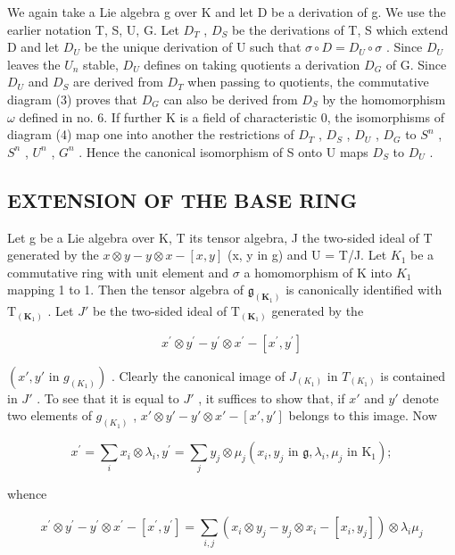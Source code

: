 We again take a Lie algebra g over K and let D be a derivation of g. We use the earlier notation T, S, U, G. Let \(D_{T}\) , \(D_{S}\) be the derivations of T, S which extend D and let \(D_{U}\) be the unique derivation of U such that \(\sigma \circ D = D_{U} \circ \sigma\) . Since \(D_{U}\) leaves the \(U_{n}\) stable, \(D_{U}\) defines on taking quotients a derivation \(D_{G}\) of G. Since \(D_{U}\) and \(D_{S}\) are derived from \(D_{T}\) when passing to quotients, the commutative diagram (3) proves that \(D_{G}\) can also be derived from \(D_{S}\) by the homomorphism \(\omega\) defined in no. 6. If further K is a field of characteristic 0, the isomorphisms of diagram (4) map one into another the restrictions of \(D_{T}\) , \(D_{S}\) , \(D_{U}\) , \(D_{G}\) to \(S^{n}\) , \(S^{n}\) , \(U^{n}\) , \(G^{n}\) . Hence the canonical isomorphism of S onto U maps \(D_{S}\) to \(D_{U}\) .

\subsection{EXTENSION OF THE BASE RING}

Let g be a Lie algebra over K, T its tensor algebra, J the two-sided ideal of T generated by the \(x \otimes y - y \otimes x - [x, y]\) (x, y in g) and U = T/J. Let \(K_{1}\) be a commutative ring with unit element and \(\sigma\) a homomorphism of K into \(K_{1}\) mapping 1 to 1. Then the tensor algebra of \(\mathfrak{g}_{(\mathbf{K}_{1})}\) is canonically identified with \(\mathrm{T}_{(\mathbf{K}_{1})}\) . Let \(J'\) be the two-sided ideal of \(\mathrm{T}_{(\mathbf{K}_{1})}\) generated by the

\[
x ^ {\prime} \otimes y ^ {\prime} - y ^ {\prime} \otimes x ^ {\prime} - [ x ^ {\prime}, y ^ {\prime} ]
\]

\((x', y' \text{ in } g_{(K_1)})\) . Clearly the canonical image of \(J_{(K_1)}\) in \(T_{(K_1)}\) is contained in \(J'\) . To see that it is equal to \(J'\) , it suffices to show that, if \(x'\) and \(y'\) denote two elements of \(g_{(K_1)}\) , \(x' \otimes y' - y' \otimes x' - [x', y']\) belongs to this image. Now

\[
x ^ {\prime} = \sum_ {i} x _ {i} \otimes \lambda_ {i}, y ^ {\prime} = \sum_ {j} y _ {j} \otimes \mu_ {j} (x _ {i}, y _ {j} \text {   in   } \mathfrak {g}, \lambda_ {i}, \mu_ {j} \text {   in   } \mathrm{K} _ {1});
\]

whence

\[
x ^ {\prime} \otimes y ^ {\prime} - y ^ {\prime} \otimes x ^ {\prime} - [ x ^ {\prime}, y ^ {\prime} ] = \sum_ {i, j} (x _ {i} \otimes y _ {j} - y _ {j} \otimes x _ {i} - [ x _ {i}, y _ {j} ]) \otimes \lambda_ {i} \mu_ {j}
\]


